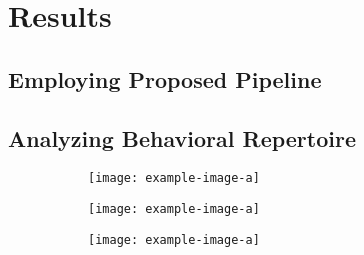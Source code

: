 \chapter{Results}

\section{Employing Proposed Pipeline}\label{section:employing-proposed-pipeline}

\section{Analyzing Behavioral Repertoire}
\begin{figure}[ht!]
	\centering
	\begin{subfigure}[ht!]{0.24\linewidth}
		\centering\texttt{[image: example-image-a]}
		\caption{\label{figure:correlations-btw-features}}
	\end{subfigure}%
\end{figure}

\begin{figure}[ht!]
	\centering
	\begin{subfigure}[ht!]{0.24\linewidth}
		\centering\texttt{[image: example-image-a]}
		\caption{\label{figure:supervised-disparate-zoomin-annotations}}
	\end{subfigure}%
	\hfill
	\centering
	\begin{subfigure}[ht!]{0.24\linewidth}
		\centering\texttt{[image: example-image-a]}
		\caption{\label{figure:unsupervised-disparate-behavioral-regions}}
	\end{subfigure}%
\end{figure}
